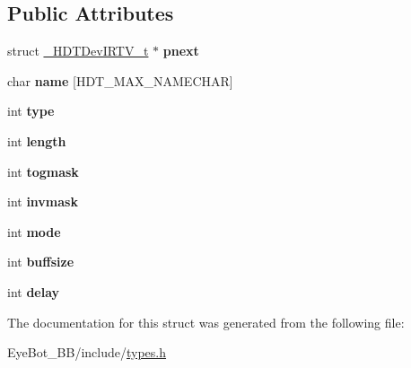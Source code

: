 \subsection*{\-Public \-Attributes}
\begin{DoxyCompactItemize}
\item 
\hypertarget{struct___h_d_t_dev_i_r_t_v__t_a6b1d21ea0380994161ba7c057ad64132}{struct \hyperlink{struct___h_d_t_dev_i_r_t_v__t}{\-\_\-\-H\-D\-T\-Dev\-I\-R\-T\-V\-\_\-t} $\ast$ {\bfseries pnext}}\label{struct___h_d_t_dev_i_r_t_v__t_a6b1d21ea0380994161ba7c057ad64132}

\item 
\hypertarget{struct___h_d_t_dev_i_r_t_v__t_a60d7e4d927cba8e464af3b47bbf18d5b}{char {\bfseries name} \mbox{[}\-H\-D\-T\-\_\-\-M\-A\-X\-\_\-\-N\-A\-M\-E\-C\-H\-A\-R\mbox{]}}\label{struct___h_d_t_dev_i_r_t_v__t_a60d7e4d927cba8e464af3b47bbf18d5b}

\item 
\hypertarget{struct___h_d_t_dev_i_r_t_v__t_a5aabd1940fc8dd1e9e7aeaf81d90f8c3}{int {\bfseries type}}\label{struct___h_d_t_dev_i_r_t_v__t_a5aabd1940fc8dd1e9e7aeaf81d90f8c3}

\item 
\hypertarget{struct___h_d_t_dev_i_r_t_v__t_a40fcd86bee3973d01ca94ad08a3e2f7c}{int {\bfseries length}}\label{struct___h_d_t_dev_i_r_t_v__t_a40fcd86bee3973d01ca94ad08a3e2f7c}

\item 
\hypertarget{struct___h_d_t_dev_i_r_t_v__t_a83a53cd9b0b18f144c8c073507620c7e}{int {\bfseries togmask}}\label{struct___h_d_t_dev_i_r_t_v__t_a83a53cd9b0b18f144c8c073507620c7e}

\item 
\hypertarget{struct___h_d_t_dev_i_r_t_v__t_ab6cdb96b1cb3b72392c22183eab94748}{int {\bfseries invmask}}\label{struct___h_d_t_dev_i_r_t_v__t_ab6cdb96b1cb3b72392c22183eab94748}

\item 
\hypertarget{struct___h_d_t_dev_i_r_t_v__t_ae268350eade846ad1cca9e9250f843d2}{int {\bfseries mode}}\label{struct___h_d_t_dev_i_r_t_v__t_ae268350eade846ad1cca9e9250f843d2}

\item 
\hypertarget{struct___h_d_t_dev_i_r_t_v__t_a4aff1125330bf0402e5d73c50178bb10}{int {\bfseries buffsize}}\label{struct___h_d_t_dev_i_r_t_v__t_a4aff1125330bf0402e5d73c50178bb10}

\item 
\hypertarget{struct___h_d_t_dev_i_r_t_v__t_a8ff0a3c4c7807afd44434f8175e68d76}{int {\bfseries delay}}\label{struct___h_d_t_dev_i_r_t_v__t_a8ff0a3c4c7807afd44434f8175e68d76}

\end{DoxyCompactItemize}


\-The documentation for this struct was generated from the following file\-:\begin{DoxyCompactItemize}
\item 
\-Eye\-Bot\-\_\-\-B\-B/include/\hyperlink{types_8h}{types.\-h}\end{DoxyCompactItemize}
